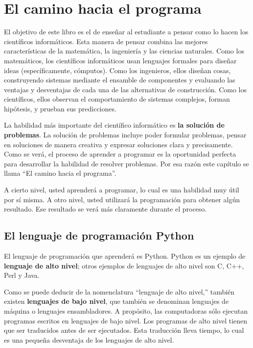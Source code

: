 
\chapter{El camino hacia el programa}

El objetivo de este libro es el de enseñar al estudiante a pensar
como lo hacen los científicos informáticos. Esta manera de pensar
combina las mejores características de la matemática, la ingeniería
y las ciencias naturales. Como los matemáticos, los científicos informáticos
usan lenguajes formales para diseñar ideas (específicamente, cómputos).
Como los ingenieros, ellos diseñan cosas, construyendo sistemas mediante
el ensamble de componentes y evaluando las ventajas y desventajas
de cada una de las alternativas de construcción. Como los científicos,
ellos observan el comportamiento de sistemas complejos, forman hipótesis,
y prueban sus predicciones.

La habilidad más importante del científico informático es \textbf{la
solución de problemas}. La solución de problemas incluye poder formular
problemas, pensar en soluciones de manera creativa y expresar soluciones
clara y precisamente. Como se verá, el proceso de aprender a programar
es la oportunidad perfecta para desarrollar la habilidad de resolver
problemas. Por esa razón este capítulo se llama ``El camino hacia
el programa''.

A cierto nivel, usted aprenderá a programar, lo cual es una habilidad
muy útil por sí misma. A otro nivel, usted utilizará la programación
para obtener algún resultado. Ese resultado se verá más claramente
durante el proceso.

\section{El lenguaje de programación Python}

 

El lenguaje de programación que aprenderá es Python. Python es un
ejemplo de \textbf{lenguaje de alto nivel}; otros ejemplos de lenguajes
de alto nivel son C, C++, Perl y Java.

Como se puede deducir de la nomenclatura ``lenguaje de alto nivel,''
también existen \textbf{lenguajes de bajo nivel}, que también se denominan
lenguajes de máquina o lenguajes ensambladores. A propósito, las computadoras
sólo ejecutan programas escritos en lenguajes de bajo nivel. Los programas
de alto nivel tienen que ser traducidos antes de ser ejecutados. Esta
traducción lleva tiempo, lo cual es una pequeña desventaja de los
lenguajes de alto nivel.

